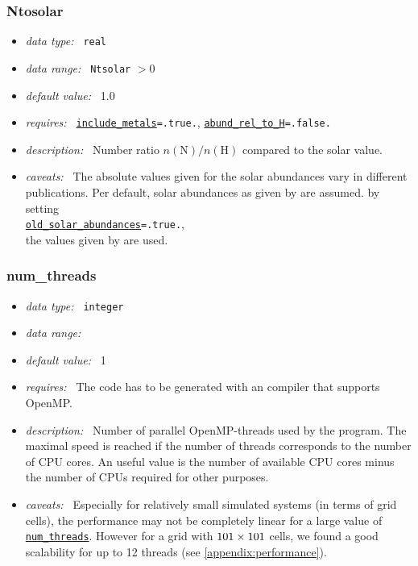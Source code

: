 \documentclass[a4paper,10pt]{article}
\begin{document}
\subsubsection{Ntosolar}
\label{opt:ntosolar}
\begin{itemize}
 \item \textit{data type:~} \texttt{real}
 \item \textit{data range:~}  \texttt{Ntsolar} $> 0$
 \item \textit{default value:~} 1.0
 \item \textit{requires:~} \texttt{\hyperref[opt:includemetals]{include\_metals}=.true.},
 \texttt{\hyperref[opt:abundreltoh]{abund\_rel\_to\_H}=.false.}
 \item \textit{description:~} Number ratio $n(\mathrm{N})/n(\mathrm{H})$ 
  compared to the solar value.
 \item \textit{caveats:~} The absolute values given for the solar abundances 
  vary in different publications. Per default, solar abundances as given by 
  \cite{Asplund2009} are assumed. by setting \\
  \texttt{\hyperref[opt:oldsolarabundances]{old\_solar\_abundances}=.true.},\\ 
  the values given by \cite{Grevesse1998} are used.
\end{itemize}


\subsubsection{num\_threads}
\label{opt:numthreads}
\begin{itemize}
 \item \textit{data type:~} \texttt{integer}
 \item \textit{data range:~}
 \item \textit{default value:~} 1
 \item \textit{requires:~} The code has to be generated with an compiler that 
  supports OpenMP.
 \item \textit{description:~} Number of parallel OpenMP-threads used by the 
  program. The maximal speed is reached if the number of threads corresponds to 
  the number of CPU cores. An useful value is the number of available CPU cores 
  minus the number of CPUs required for other purposes. 
 \item \textit{caveats:~} Especially for relatively small simulated systems 
  (in terms of grid cells), the performance may not be completely linear for a 
  large value of \texttt{\hyperref[opt:numthreads]{num\_threads}}.
  However for a grid with $101\times101\time101$ cells, we found a good 
  scalability for up to 12 threads (see \ref{appendix:performance}).
\end{itemize}
\end{document}
